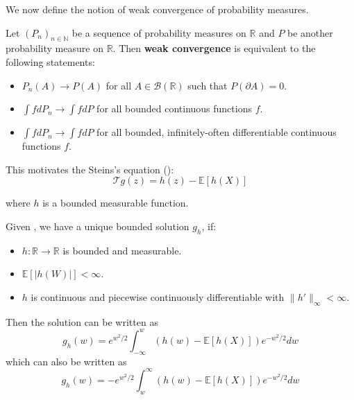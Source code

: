 \documentclass{article}
\begin{document}
We now define the notion of weak convergence of probability measures.  

\begin{definition}
   Let $(P_n)_{n\in \mathbb{N}}$ be a sequence of probability measures on $\mathbb{R}$ and $P$ be another probability measure on $\mathbb{R}$. Then \textbf{weak convergence} is equivalent to the following statements:
   \begin{itemize}
    \item $P_n(A) \to P(A)$ for all $A \in \mathcal{B}(\mathbb{R})$ such that $P(\partial A)=0$.
    \item $\int f dP_n \to \int f dP$ for all bounded continuous functions $f$.
    \item $\int f dP_n \to \int f dP$ for all bounded, infinitely-often differentiable continuous functions $f$.
   \end{itemize}
\end{definition}

This motivates the Steins's equation ():
\begin{equation}\label{eq:stein_equation_normal}
    \mathcal{T}g(z) = h(z) - \mathbb{E}[h(X)]
\end{equation}

where $h$ is a bounded measurable function.


\begin{lemma}\label{lem:stein_equation_normal}
    Given , we have a unique bounded solution $g_h$, if:
    \begin{itemize}
        \item $h:\mathbb{R} \to \mathbb{R}$ is bounded and measurable.
        \item $\mathbb{E}[|h(W)|] < \infty$.
        \item $h$ is continuous and piecewise continuously differentiable with $\|h'\|_\infty < \infty$.
    \end{itemize}

        Then the solution can be written as
        \begin{equation*}
            g_h(w) = e^{w^2/2} \int_{-\infty}^w (h(w) - \mathbb{E}[h(X)]) e^{-w^2/2} dw
        \end{equation*}
        which can also be written as
        \begin{equation*}
            g_h(w) = -e^{w^2/2} \int_{w}^\infty (h(w) - \mathbb{E}[h(X)]) e^{-w^2/2} dw
        \end{equation*}
    \end{lemma}
\end{document}
